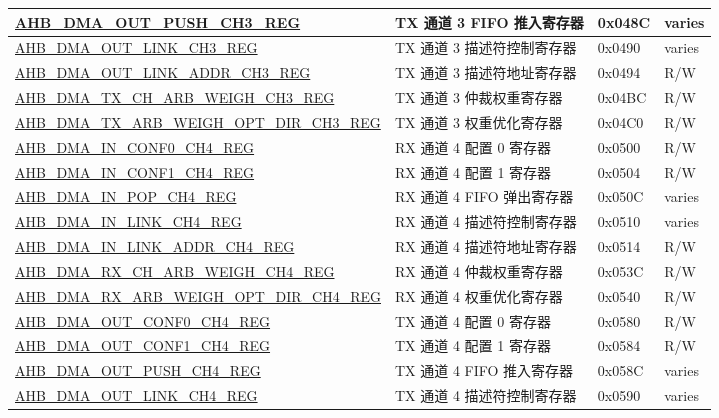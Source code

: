 \begin{longtable}{ | l | l | p{1.3cm} | l | }
\hyperref[regdesc:AHBDMAOUTPUSHCHNREG]{AHB\_DMA\_OUT\_PUSH\_CH3\_REG} & TX 通道 3 FIFO 推入寄存器 & 0x048C & varies    \\ \hline
\hyperref[regdesc:AHBDMAOUTLINKCHNREG]{AHB\_DMA\_OUT\_LINK\_CH3\_REG} & TX 通道 3 描述符控制寄存器 & 0x0490 & varies    \\ \hline
\hyperref[regdesc:AHBDMAOUTLINKADDRCHNREG]{AHB\_DMA\_OUT\_LINK\_ADDR\_CH3\_REG} & TX 通道 3 描述符地址寄存器 & 0x0494 & R/W    \\ \hline
\hyperref[regdesc:AHBDMATXCHARBWEIGHCHNREG]{AHB\_DMA\_TX\_CH\_ARB\_WEIGH\_CH3\_REG} & TX 通道 3 仲裁权重寄存器 & 0x04BC & R/W    \\ \hline
\hyperref[regdesc:AHBDMATXARBWEIGHOPTDIRCHNREG]{AHB\_DMA\_TX\_ARB\_WEIGH\_OPT\_DIR\_CH3\_REG} & TX 通道 3 权重优化寄存器 & 0x04C0 & R/W    \\ \hline
\hyperref[regdesc:AHBDMAINCONF0CHNREG]{AHB\_DMA\_IN\_CONF0\_CH4\_REG} & RX 通道 4 配置 0 寄存器 & 0x0500 & R/W    \\ \hline
\hyperref[regdesc:AHBDMAINCONF1CHNREG]{AHB\_DMA\_IN\_CONF1\_CH4\_REG} & RX 通道 4 配置 1 寄存器 & 0x0504 & R/W    \\ \hline
\hyperref[regdesc:AHBDMAINPOPCHNREG]{AHB\_DMA\_IN\_POP\_CH4\_REG} & RX 通道 4 FIFO 弹出寄存器 & 0x050C & varies    \\ \hline
\hyperref[regdesc:AHBDMAINLINKCHNREG]{AHB\_DMA\_IN\_LINK\_CH4\_REG} & RX 通道 4 描述符控制寄存器 & 0x0510 & varies    \\ \hline
\hyperref[regdesc:AHBDMAINLINKADDRCHNREG]{AHB\_DMA\_IN\_LINK\_ADDR\_CH4\_REG} & RX 通道 4 描述符地址寄存器 & 0x0514 & R/W    \\ \hline
\hyperref[regdesc:AHBDMARXCHARBWEIGHCHNREG]{AHB\_DMA\_RX\_CH\_ARB\_WEIGH\_CH4\_REG} & RX 通道 4 仲裁权重寄存器 & 0x053C & R/W    \\ \hline
\hyperref[regdesc:AHBDMARXARBWEIGHOPTDIRCHNREG]{AHB\_DMA\_RX\_ARB\_WEIGH\_OPT\_DIR\_CH4\_REG} & RX 通道 4 权重优化寄存器 & 0x0540 & R/W    \\ \hline
\hyperref[regdesc:AHBDMAOUTCONF0CHNREG]{AHB\_DMA\_OUT\_CONF0\_CH4\_REG} & TX 通道 4 配置 0 寄存器 & 0x0580 & R/W    \\ \hline
\hyperref[regdesc:AHBDMAOUTCONF1CHNREG]{AHB\_DMA\_OUT\_CONF1\_CH4\_REG} & TX 通道 4 配置 1 寄存器 & 0x0584 & R/W    \\ \hline
\hyperref[regdesc:AHBDMAOUTPUSHCHNREG]{AHB\_DMA\_OUT\_PUSH\_CH4\_REG} & TX 通道 4 FIFO 推入寄存器 & 0x058C & varies    \\ \hline
\hyperref[regdesc:AHBDMAOUTLINKCHNREG]{AHB\_DMA\_OUT\_LINK\_CH4\_REG} & TX 通道 4 描述符控制寄存器 & 0x0590 & varies    \\ \hline

\end{longtable}
